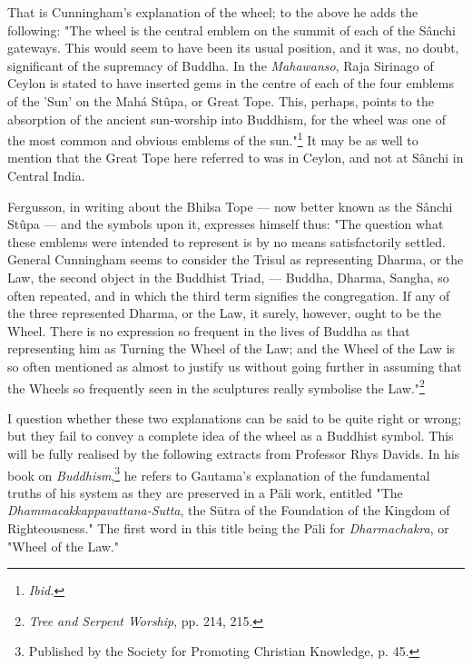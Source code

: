 \documentclass[a4paper, 11pt, oneside, polutonikogreek, english]{article}
\begin{document}
That is Cunningham's explanation of the wheel; to the above he adds the following: "The wheel is the central emblem on the summit of each of the Sânchi gateways. This would seem to have been its usual position, and it was, no doubt, significant of the supremacy of Buddha. In the \emph{Mahawanso}, Raja Sirinago of Ceylon is stated to have inserted gems in the centre of each of the four emblems of the 'Sun' on the Mahá Stûpa, or Great Tope. This, perhaps, points to the absorption of the ancient sun-worship into Buddhism, for the wheel was one of the most common and obvious emblems of the sun."\footnote{\emph{Ibid.}} It may be as well to mention that the Great Tope here referred to was in Ceylon, and not at Sânchi in Central India.

Fergusson, in writing about the Bhilsa Tope --- now better known as the Sânchi Stûpa --- and the symbols upon it, expresses himself thus: "The question what these emblems were intended to represent is by no means satisfactorily settled. General Cunningham seems to consider the Trisul as representing Dharma, or the Law, the second object in the Buddhist Triad, --- Buddha, Dharma, Sangha, so often repeated, and in which the third term signifies the congregation. If any of the three represented Dharma, or the Law, it surely, however, ought to be the Wheel. There is no expression so frequent in the lives of Buddha as that representing him as Turning the Wheel of the Law; and the Wheel of the Law is so often mentioned as almost to justify us without going further in assuming that the Wheels so frequently seen in the sculptures really symbolise the Law."\footnote{\emph{Tree and Serpent Worship}, pp. 214, 215.}

I question whether these two explanations can be said to be quite right or wrong; but they fail to convey a complete idea of the wheel as a Buddhist symbol. This will be fully realised by the following extracts from Professor Rhys Davids. In his book on \emph{Buddhism},\footnote{Published by the Society for Promoting Christian Knowledge, p. 45.} he refers to Gautama's explanation of the fundamental truths of his system as they are preserved in a Pāli work, entitled "The \emph{Dhammacakkappavattana-Sutta}, the Sūtra of the Foundation of the Kingdom of Righteousness." The first word in this title being the Pāli for \emph{Dharmachakra}, or "Wheel of the Law."
\end{document}
